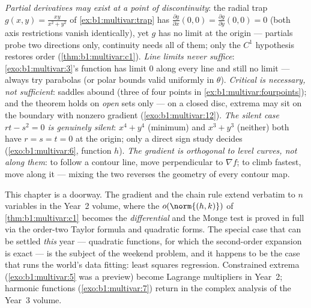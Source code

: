 \begin{remark}
\label{rem:b1:multivar:pitfalls}
\emph{Partial derivatives may exist at a point of
discontinuity}: the radial trap $g(x,y) = \frac{xy}{x^2+y^2}$ of
\cref{ex:b1:multivar:trap} has $\frac{\partial g}{\partial
x}(0,0) = \frac{\partial g}{\partial y}(0,0) = 0$ (both axis
restrictions vanish identically), yet $g$ has no limit at the
origin --- partials probe two directions only, continuity needs
all of them; only the $C^1$ hypothesis restores order
(\cref{thm:b1:multivar:c1}).
\emph{Line limits never suffice}: \cref{exo:b1:multivar:3}'s
function has limit $0$ along every line and still no limit ---
always try parabolas (or polar bounds valid uniformly in
$\theta$).
\emph{Critical is necessary, not sufficient}: saddles abound
(three of four points in \cref{ex:b1:multivar:fourpoints}); and
the theorem holds on \emph{open} sets only --- on a closed disc,
extrema may sit on the boundary with nonzero gradient
(\cref{exo:b1:multivar:12}).
\emph{The silent case $rt - s^2 = 0$ is genuinely silent}: $x^4
+ y^4$ (minimum) and $x^3 + y^3$ (neither) both have $r = s = t
= 0$ at the origin; only a direct sign study decides
(\cref{exo:b1:multivar:6}, function $h$).
\emph{The gradient is orthogonal to level curves, not along
them}: to follow a contour line, move perpendicular to $\nabla
f$; to climb fastest, move along it --- mixing the two reverses
the geometry of every contour map.
\end{remark}

\begin{remark}
\label{rem:b1:multivar:whereused}
This chapter is a doorway. The gradient and the chain rule extend
verbatim to $n$ variables in the Year~2 volume, where the
$o(\norm{(h,k)})$ of \cref{thm:b1:multivar:c1} becomes the
\emph{differential} and the Monge test is proved in full via the
order-two Taylor formula and quadratic forms. The special case
that can be settled \emph{this} year --- quadratic functions,
for which the second-order expansion is exact --- is the subject
of the weekend problem, and it happens to be the case that runs
the world's data fitting: least squares regression. Constrained
extrema (\cref{exo:b1:multivar:5} was a preview) become Lagrange
multipliers in Year~2; harmonic functions
(\cref{exo:b1:multivar:7}) return in the complex analysis of the
Year~3 volume.
\end{remark}

